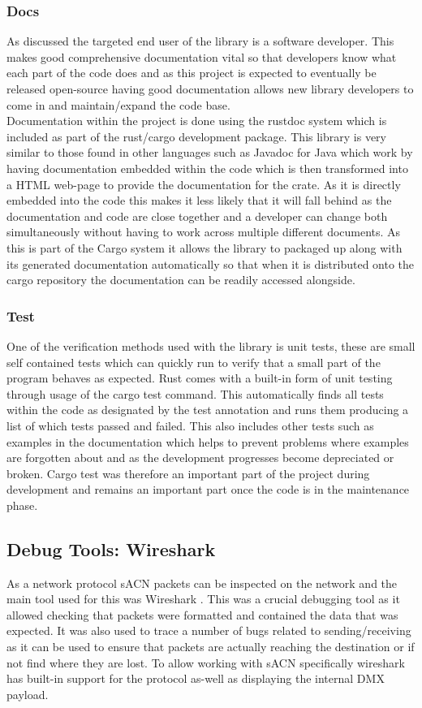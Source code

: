 \documentclass[11pt,a4paper]{article}
\begin{document}
\subsubsection{Docs}
As discussed the targeted end user of the library is a software developer. This makes good comprehensive documentation vital so that developers know what each part of the code does and as this project is expected to eventually be released open-source having good documentation allows new library developers to come in and maintain/expand the code base.\\

Documentation within the project is done using the rustdoc system which is included as part of the rust/cargo development package. This library is very similar to those found in other languages such as Javadoc for Java which work by having documentation embedded within the code which is then transformed into a HTML web-page to provide the documentation for the crate. As it is directly embedded into the code this makes it less likely that it will fall behind as the documentation and code are close together and a developer can change both simultaneously without having to work across multiple different documents. As this is part of the Cargo system it allows the library to packaged up along with its generated documentation automatically so that when it is distributed onto the cargo repository the documentation can be readily accessed alongside.

\subsubsection{Test}
One of the verification methods used with the library is unit tests, these are small self contained tests which can quickly run to verify that a small part of the program behaves as expected. Rust comes with a built-in form of unit testing through usage of the cargo test command. This automatically finds all tests within the code as designated by the test annotation and runs them producing a list of which tests passed and failed. This also includes other tests such as examples in the documentation which helps to prevent problems where examples are forgotten about and as the development progresses become depreciated or broken. Cargo test was therefore an important part of the project during development and remains an important part once the code is in the maintenance phase.

\subsection{Debug Tools: Wireshark}
As a network protocol sACN packets can be inspected on the network and the main tool used for this was Wireshark \cite{WIRESHARK}. This was a crucial debugging tool as it allowed checking that packets were formatted and contained the data that was expected. It was also used to trace a number of bugs related to sending/receiving as it can be used to ensure that packets are actually reaching the destination or if not find where they are lost.  To allow working with sACN specifically wireshark has built-in support for the protocol as-well as displaying the internal DMX payload.
\end{document}
